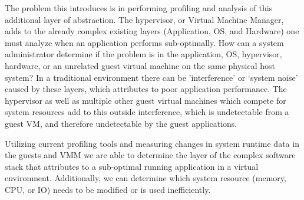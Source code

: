 \indent The problem this introduces is in performing profiling and analysis of this additional layer of abstraction.  The hypervisor, or Virtual Machine Manager, adds to the already complex existing layers (Application, OS, and Hardware) one must analyze when an application performs sub-optimally.  How can a system administrator determine if the problem is in the application, OS, hypervisor, hardware, or an unrelated guest virtual machine on the same physical host system?  In a traditional environment there can be 'interference' \cite{paul}or ‘system noise' caused by these layers, which attributes to poor application performance.  The hypervisor as well as multiple other guest virtual machines which compete for system resources add to this outside interference, which is undetectable from a guest VM, and therefore undetectable by the guest applications.

\indent Utilizing current profiling tools and measuring changes in system runtime data in the guests and VMM we are able to determine the layer of the complex software stack that attributes to a sub-optimal running application in a virtual environment.  Additionally, we can determine which system resource (memory, CPU, or IO) needs to be modified or is used inefficiently.

